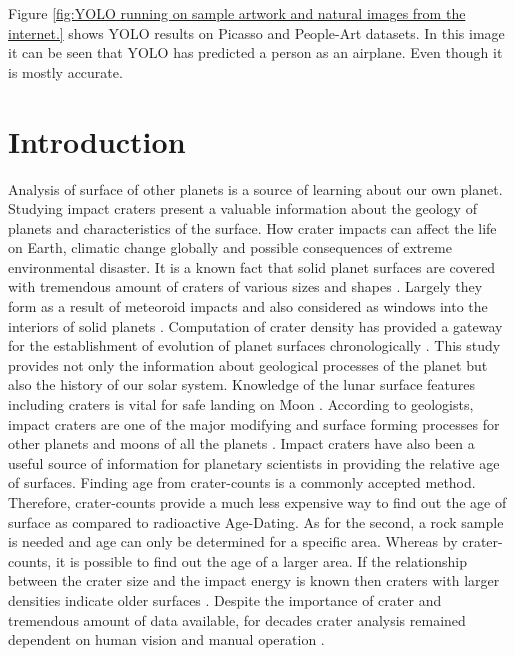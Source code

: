 \documentclass[11pt]{article}
\begin{document}
Figure \ref{fig:YOLO running on sample artwork and natural images from the internet.} shows YOLO results on Picasso and People-Art datasets. In this image it can be seen that YOLO has predicted a person as an airplane. Even though it is mostly accurate.
\fi

\section{Introduction}
Analysis of surface of other planets is a source of learning about our own planet. Studying impact craters present a valuable information about the geology of planets and characteristics of the surface. How crater impacts can affect the life on Earth, climatic change globally and possible consequences of extreme environmental disaster. It is a known fact that solid planet surfaces are covered with tremendous amount of craters of various sizes and shapes \cite{melosh1988rocky}. Largely they form as a result of meteoroid impacts and also considered as windows into the interiors of solid planets \cite{honda2000crater}. Computation of crater density has provided a gateway for the establishment of evolution of planet surfaces chronologically \cite{martins2009crater}. This study provides not only the information about geological processes of the planet but also the history of our solar system. Knowledge of the lunar surface features including craters is vital for safe landing on Moon \cite{ivanov2015probabilistic}. According to geologists, impact craters are one of the major modifying and surface forming processes for other planets and moons of all the planets \cite{koeberl1994african}. Impact craters have also been a useful source of information for planetary scientists in providing the relative age of surfaces. Finding age from crater-counts is a commonly accepted method. Therefore, crater-counts provide a much less expensive way to find out the age of surface as compared to radioactive Age-Dating. As for the second, a rock sample is needed and age can only be determined for a specific area. Whereas by crater-counts, it is possible to find out the age of a larger area. If the relationship between the crater size and the impact energy is known then craters with larger densities indicate older surfaces \cite{ivanov2002comparison}. Despite the importance of crater and tremendous amount of data available, for decades crater analysis remained dependent on human vision and manual operation \cite{honda2000crater}.
\end{document}
